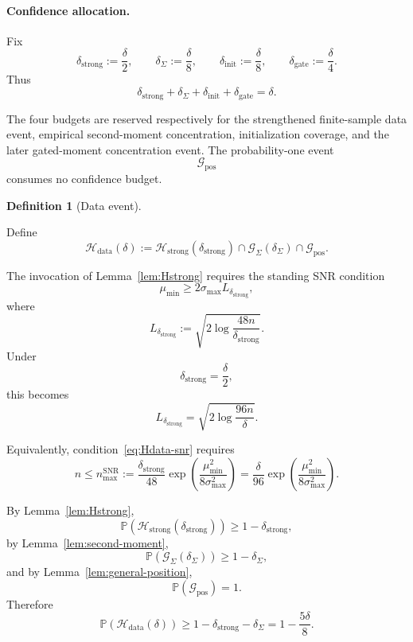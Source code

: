 \documentclass{article} %
\theoremstyle{plain}
\theoremstyle{definition}
\newtheorem{definition}[theorem]{Definition}
\theoremstyle{remark}
\begin{document}
\paragraph{Confidence allocation.}

Fix
\[
\boxed{
\delta_{\mathrm{strong}}
:=
\frac{\delta}{2},
\qquad
\delta_{\Sigma}
:=
\frac{\delta}{8},
\qquad
\delta_{\mathrm{init}}
:=
\frac{\delta}{8},
\qquad
\delta_{\mathrm{gate}}
:=
\frac{\delta}{4}.
}
\]
Thus
\[
\boxed{
\delta_{\mathrm{strong}}
+
\delta_{\Sigma}
+
\delta_{\mathrm{init}}
+
\delta_{\mathrm{gate}}
=
\delta.
}
\]

The four budgets are reserved respectively for the strengthened finite-sample
data event, empirical second-moment concentration, initialization coverage,
and the later gated-moment concentration event. The probability-one event
\[
\mathcal G_{\mathrm{pos}}
\]
consumes no confidence budget.


\begin{definition}[Data event]
\label{def:Hdata}

Define
\[
\boxed{
\mathcal H_{\mathrm{data}}(\delta)
:=
\mathcal H_{\mathrm{strong}}(\delta_{\mathrm{strong}})
\cap
\mathcal G_{\Sigma}(\delta_{\Sigma})
\cap
\mathcal G_{\mathrm{pos}}.
}
\]
\end{definition}

The invocation of Lemma~\ref{lem:Hstrong} requires the standing SNR
condition
\begin{equation}
\boxed{
\mu_{\min}
\ge
2\sigma_{\max}L_{\delta_{\mathrm{strong}}},
}
\label{eq:Hdata-snr}
\end{equation}
where
\[
L_{\delta_{\mathrm{strong}}}
:=
\sqrt{
2\log
\frac{48n}{\delta_{\mathrm{strong}}}
}.
\]
Under
\[
\delta_{\mathrm{strong}}
=
\frac{\delta}{2},
\]
this becomes
\[
L_{\delta_{\mathrm{strong}}}
=
\sqrt{
2\log
\frac{96n}{\delta}
}.
\]

Equivalently, condition~\eqref{eq:Hdata-snr} requires
\begin{equation}
\boxed{
n
\le
n_{\max}^{\mathrm{SNR}}
:=
\frac{\delta_{\mathrm{strong}}}{48}
\exp
\left(
\frac{\mu_{\min}^2}
{8\sigma_{\max}^2}
\right)
=
\frac{\delta}{96}
\exp
\left(
\frac{\mu_{\min}^2}
{8\sigma_{\max}^2}
\right).
}
\label{eq:nmax-snr}
\end{equation}

By Lemma~\ref{lem:Hstrong},
\[
\mathbb P
\left(
\mathcal H_{\mathrm{strong}}(\delta_{\mathrm{strong}})
\right)
\ge
1-\delta_{\mathrm{strong}},
\]
by Lemma~\ref{lem:second-moment},
\[
\mathbb P
\left(
\mathcal G_{\Sigma}(\delta_{\Sigma})
\right)
\ge
1-\delta_{\Sigma},
\]
and by Lemma~\ref{lem:general-position},
\[
\mathbb P(\mathcal G_{\mathrm{pos}})=1.
\]
Therefore
\[
\boxed{
\mathbb P
\left(
\mathcal H_{\mathrm{data}}(\delta)
\right)
\ge
1-\delta_{\mathrm{strong}}-\delta_{\Sigma}
=
1-\frac{5\delta}{8}.
}
\]
\end{document}
